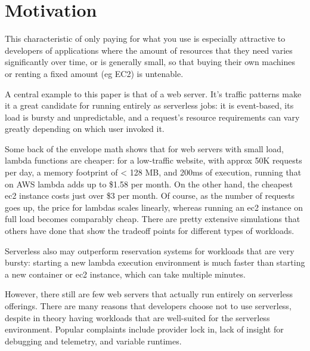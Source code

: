 \section{Motivation}\label{motivation}


This characteristic of only paying for what you use is especially attractive to
developers of applications where the amount of resources that they need varies
significantly over time, or is generally small, so that buying their own
machines or renting a fixed amount (eg EC2) is untenable.

A central example to this paper is that of a web server. It's traffic patterns
make it a great candidate for running entirely as serverless jobs: it is
event-based, its load is bursty and unpredictable, and a request's resource
requirements can vary greatly depending on which user invoked it.


Some back of the envelope math shows that for web servers with small load,
lambda functions are cheaper: for a low-traffic website, with approx 50K
requests per day, a memory footprint of < 128 MB, and 200ms of execution,
running that on AWS lambda adds up to \$1.58 per month. On the other hand, the
cheapest ec2 instance costs just over \$3 per month. Of course, as the number of
requests goes up, the price for lambdas scales linearly, whereas running an ec2
instance on full load becomes comparably cheap. There are pretty extensive
simulations that others have done that show the tradeoff points for different
types of workloads.

Serverless also may outperform reservation systems for workloads that are very
bursty: starting a new lambda execution environment is much faster than starting
a new container or ec2 instance, which can take multiple minutes.


However, there still are few web servers that actually run entirely on
serverless offerings. There are many reasons that developers choose not to use
serverless, despite in theory having workloads that are well-suited for the
serverless environment.
Popular complaints include provider lock in, lack of insight for debugging and
telemetry, and variable runtimes.


